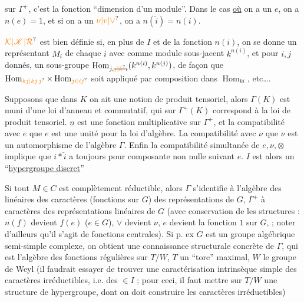 sur $ {\Gamma}^+$, c'est la fonction ``dimension d'un
module''. Dans le cas \uline{où} on a un $e$,
on a $n(e)=1$, et si on a un $\unsure{\nu|v|\vee}$, on a
$n(\check i)=n(i)$.

$\unsure{\mathcal K|\mathscr K|\mathcal R}$ est bien définie si, en plus de
$I$ et de la fonction $n(i)$, on se donne un
représentant $M_i$ de chaque $i$ avec comme
module sous-jacent $k^{n(i)}$, et pour $i,j$ donnés,
un sous-groupe $\operatorname{Hom}_{j,\deleted{\unsure{j|k}}i}(k^{n(i)},k^{n(j)})$,
de façon que $\operatorname{Hom}_{\unsure{kj|kj\,j}}\times\operatorname{Hom}_{\unsure{ji|ij}}$ soit appliqué
par composition dans $\operatorname{Hom}_{ki}$, etc\ldots.

Supposons que dans $K$ on ait une
notion de produit tensoriel, alors
$\Gamma(K)$ est muni d'une loi d'anneau 
et commutatif, qui sur $\Gamma^+(K)$  correspond
à la loi de produit tensoriel. $\underline n$ est une
fonction multiplicative sur $\Gamma^+$, et la
compatibilité avec $e$   que $e$ est
une unité pour  la loi d'algèbre. La
compatibilité avec $\nu$   que $\nu$ est
un automorphisme de l'algèbre $\Gamma$. Enfin
la compatibilité simultanée de
$e,\nu,\otimes$ implique que $i*\check i$ a toujours
pour composante non nulle suivant $e$.
$I$ est alors un ``\uline{hypergroupe discret}''

Si tout $M\in C$ est complètement réductible,
alors $\Gamma$ s'identifie à l'algèbre des 
  linéaires des caractères (fonctions sur
$G$) des représentations  de $G$,
$\Gamma^+$ à   caractères des représentations linéaires
de $G$ (avec conservation de  les
structures : $n(f)$ devient $f(e)$ ($e\in G$),
$\vee$ devient $\nu$, $e$ devient la fonction $1$ sur $G$,
 ; noter d'ailleurs qu'il
s'agit de fonctions centrales). Si p. ex
$G$ est un groupe algébrique semi-simple complexe,
on obtient une connaissance structurale
concrète de $\Gamma$, qui est l'algèbre des
fonctions régulières sur $T/W$, $T$ un
``tore'' maximal, $W$ le groupe de Weyl
(il faudrait essayer de trouver une
caractérisation intrinsèque simple des
caractères irréductibles, i.e. des $\in I$ ; pour
ceci, il faut mettre sur $T/W$ une
 structure de hypergroupe, dont on
doit construire les caractères irréductibles)

